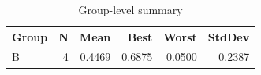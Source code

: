 \begin{table}[htbp]
\centering
\caption{Group-level summary}
\label{tab:group-summary}
\begin{tabular}{lrrrrr}
\toprule
\textbf{Group} & \textbf{N} & \textbf{Mean} & \textbf{Best} & \textbf{Worst} & \textbf{StdDev} \\
\midrule
B & 4 & 0.4469 & 0.6875 & 0.0500 & 0.2387 \\
\bottomrule
\end{tabular}
\end{table}